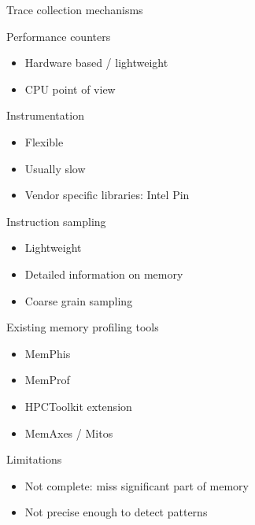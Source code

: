 \documentclass[xcolor={usenames,dvipsnames},hyperref={pdfusetitle}]{beamer}
\begin{document}
\begin{frame}{Trace collection mechanisms}
    \begin{block}{Performance counters~\cite{Browne00Portable,Treibig10LIKWID}}
        \begin{itemize}
            \item Hardware based / lightweight
            \item CPU point of view
        \end{itemize}
    \end{block}
    \pause
    \begin{block}{Instrumentation}
        \begin{itemize}
            \item Flexible
            \item Usually slow
            \item Vendor specific libraries: Intel Pin~\cite{Luk05Pin}
        \end{itemize}
    \end{block}
    \pause
    \begin{alertblock}{Instruction sampling~\cite{Drongowski07Instructionbased,Levinthal09Performance}}
        \begin{itemize}
            \item Lightweight
            \item Detailed information on memory
            \item Coarse grain sampling
        \end{itemize}
    \end{alertblock}
\end{frame}

\begin{frame}{Existing memory profiling tools}
    \begin{block}{}
        \begin{itemize}
            \item  MemPhis~\cite{McCurdy10Memphis}
            \item<alert@1->  MemProf~\cite{Lachaize12MemProf}
            \item  HPCToolkit extension~\cite{Liu14Tool}
            \item <alert@1-> MemAxes / Mitos~\cite{Gimenez14Dissecting}
        \end{itemize}
    \end{block}
    \pause
    \begin{alertblock}{Limitations}
        \begin{itemize}
            \item Not complete: miss significant part of memory
            \item Not precise enough to detect patterns
        \end{itemize}
    \end{alertblock}
\end{frame}
\end{document}
